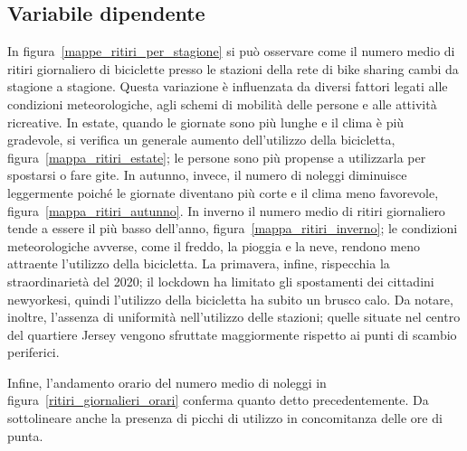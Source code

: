 \subsection[Numero di ritiri]{Variabile dipendente}
In figura~\ref{mappe_ritiri_per_stagione} si può osservare come il numero medio di ritiri giornaliero di biciclette presso le stazioni della rete di bike sharing cambi da stagione a stagione. Questa variazione è influenzata da diversi fattori legati alle condizioni meteorologiche, agli schemi di mobilità delle persone e alle attività ricreative. In estate, quando le giornate sono più lunghe e il clima è più gradevole, si verifica un generale aumento dell'utilizzo della bicicletta, figura~\ref{mappa_ritiri_estate}; le persone sono più propense a utilizzarla per spostarsi o fare gite. In autunno, invece, il numero di noleggi diminuisce leggermente poiché le giornate diventano più corte e il clima meno favorevole, figura~\ref{mappa_ritiri_autunno}. In inverno il numero medio di ritiri giornaliero tende a essere il più basso dell'anno, figura~\ref{mappa_ritiri_inverno}; le condizioni meteorologiche avverse, come il freddo, la pioggia e la neve, rendono meno attraente l'utilizzo della bicicletta. La primavera, infine, rispecchia la straordinarietà del \num{2020}; il lockdown ha limitato gli spostamenti dei cittadini newyorkesi, quindi l'utilizzo della bicicletta ha subito un brusco calo. Da notare, inoltre, l'assenza di uniformità nell'utilizzo delle stazioni; quelle situate nel centro del quartiere Jersey vengono sfruttate maggiormente rispetto ai punti di scambio periferici.
\par Infine, l'andamento orario del numero medio di noleggi in figura~\ref{ritiri_giornalieri_orari} conferma quanto detto precedentemente. Da sottolineare anche la presenza di picchi di utilizzo in concomitanza delle ore di punta.

